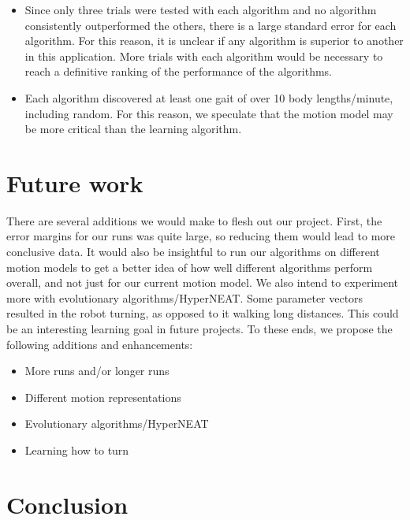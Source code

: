 
\begin{itemize}
\item  Since only three trials were tested with each algorithm and no algorithm consistently outperformed the others, there is a large standard error for each algorithm. For this reason, it is unclear if any algorithm is superior to another in this application. More trials with each algorithm would be necessary to reach a definitive ranking of the performance of the algorithms.

\item Each algorithm discovered at least one gait of over 10 body lengths/minute, including random. For this reason, we speculate that the motion model may be more critical than the learning algorithm.
\end{itemize}



\section{Future work}

There are several additions we would make to flesh out our project. First,
the error margins for our runs was quite large, so reducing them would lead
to more conclusive data. It would also be insightful to run our algorithms
on different motion models to get a better idea of how well different
algorithms perform overall, and not just for our current motion model. We
also intend to experiment more with evolutionary algorithms/HyperNEAT. 
Some parameter vectors resulted in the robot turning, as opposed to it
walking long distances. This could be an interesting learning goal in
future projects. To these ends, we propose the following additions
and enhancements:

\begin{itemize}
\item More runs and/or longer runs
\item Different motion representations
\item Evolutionary algorithms/HyperNEAT\cite{2}
\item Learning how to turn
\end{itemize}



\section{Conclusion}


